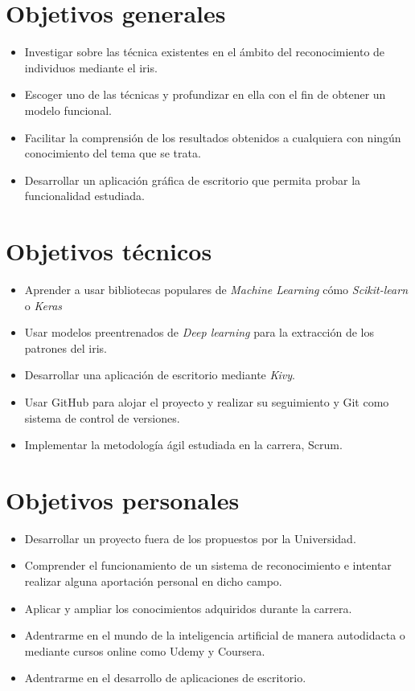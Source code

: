
\section{Objetivos generales}

\begin{itemize}
	\item Investigar sobre las técnica existentes en el ámbito del reconocimiento de individuos mediante el iris.
	\item Escoger uno de las técnicas y profundizar en ella con el fin de obtener un modelo funcional.
	\item Facilitar la comprensión de los resultados obtenidos a cualquiera con ningún conocimiento del tema que se trata.
	\item Desarrollar un aplicación gráfica de escritorio que permita probar la funcionalidad estudiada.
\end{itemize}

\section{Objetivos técnicos}

\begin{itemize}
	\item Aprender a usar bibliotecas populares de \emph{Machine Learning} cómo \emph{Scikit-learn} o \emph{Keras}
	\item Usar modelos preentrenados de \emph{Deep learning} para la extracción de los patrones del iris.
	\item Desarrollar una aplicación de escritorio mediante \emph{Kivy}.
	\item Usar GitHub para alojar el proyecto y realizar su seguimiento y Git como sistema de control de versiones.
	\item Implementar la metodología ágil estudiada en la carrera, Scrum.
\end{itemize}

\section{Objetivos personales}

\begin{itemize}
	\item Desarrollar un proyecto fuera de los propuestos por la Universidad.
	\item Comprender el funcionamiento de un sistema de reconocimiento e intentar realizar alguna aportación personal en dicho campo.
	\item Aplicar y ampliar los conocimientos adquiridos durante la carrera.
	\item Adentrarme en el mundo de la inteligencia artificial de manera autodidacta o mediante cursos online como Udemy y Coursera.
	\item Adentrarme en el desarrollo de aplicaciones de escritorio.
\end{itemize}